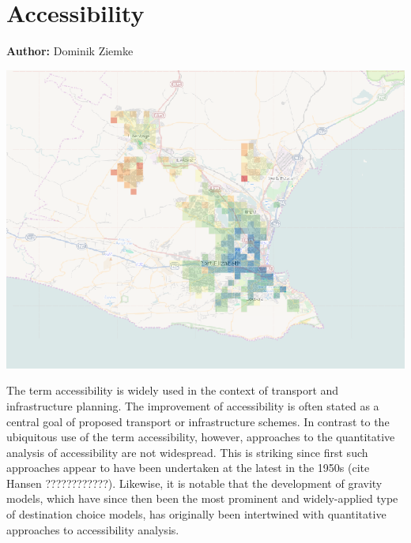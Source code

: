 \chapter{Accessibility }
\label{ch:accessibility}

\hfill \textbf{Author:} Dominik Ziemke

\begin{center} \includegraphics[width=1.\textwidth, angle=0]{extending/figures/accessibility/w_freeSpeed_snapshot.png} \end{center}


The term accessibility is widely used in the context of transport and infrastructure planning. The improvement of accessibility is often stated as a central goal of proposed transport or infrastructure schemes. In contrast to the ubiquitous use of the term accessibility, however, approaches to the quantitative analysis of accessibility are not widespread. This is striking since first such approaches appear to have been undertaken at the latest in the 1950s (cite Hansen ????????????). Likewise, it is notable that the development of gravity models, which have since then been the most prominent and widely-applied type of destination choice models, has originally been intertwined with quantitative approaches to accessibility analysis.

